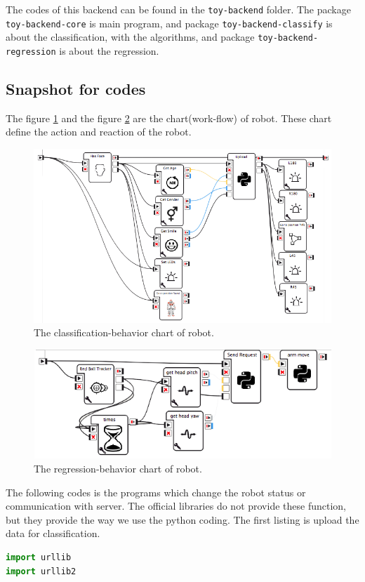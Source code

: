 \documentclass{article}
\begin{document}
\begin{appendix}
	The codes of this backend can be found in the \verb|toy-backend| folder.
	The package \verb|toy-backend-core| is main program, and package \verb|toy-backend-classify| is about the classification,
	with the algorithms, and package \verb|toy-backend-regression| is about the regression.
	
	\subsection{Snapshot for codes}
	\label{code:nao:snapshot}
	
	The figure \ref{fig:nao-classify} and the figure \ref{fig:nao-regress} are the chart(work-flow) of robot.
	These chart define the action and reaction of the robot. 
	
	\begin{figure}
		\centering
		\includegraphics[width=0.7\linewidth]{nao-classify}
		\caption{The classification-behavior chart of robot.}
		\label{fig:nao-classify}
	\end{figure}
	\begin{figure}
		\centering
		\includegraphics[width=0.7\linewidth]{nao-regress}
		\caption{The regression-behavior chart of robot.}
		\label{fig:nao-regress}
	\end{figure}
	
	The following codes is the programs which change the robot status or communication with server.
	The official libraries do not provide these function, but they provide the way we use the python  coding.
	The first listing is upload the data for classification.
	\begin{lstlisting}[language=python]
import urllib
import urllib2


\end{lstlisting}
\end{appendix}
\end{document}
